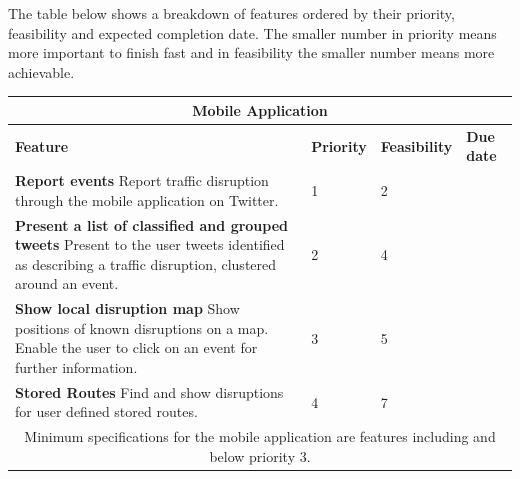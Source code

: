 The table below shows a breakdown of features ordered by their priority, feasibility and expected completion date. The smaller number in priority means more important to finish fast and in feasibility the smaller number means more achievable.

\begin{center}
\begin{tabular}{ | p{9cm} | p{1.6cm} | p{1.8cm} | p{1.8cm} | }
\hline
\multicolumn{4}{|c|}{\textbf{Mobile Application}} \\ \hline
\textbf{Feature} & \textbf{Priority} & \textbf{Feasibility} & \textbf{Due date} \\ \hline
\textbf{Report events}\newline
Report traffic disruption through the mobile application on Twitter. & 1 & 2 & \\ \hline
\textbf{Present a list of classified and grouped tweets}\newline
Present to the user tweets identified as describing a traffic disruption,
clustered around an event. & 2 & 4 & \\ \hline
\textbf{Show local disruption map}\newline
Show positions of known disruptions on a map. Enable the user to click on an event for further information. & 3 & 5 & \\ \hline
\textbf{Stored Routes}\newline
Find and show disruptions for user defined stored routes. & 4 & 7 & \\ \hline
\multicolumn{4}{|c|}{Minimum specifications for the mobile application are
features including and below priority 3.} \\ \hline
\end{tabular}
\end{center}
